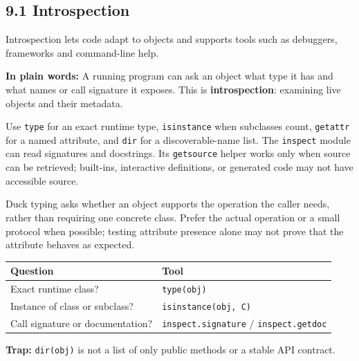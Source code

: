 \documentclass[11pt]{article}
\begin{document}
\begin{keepsection}
\section{9.1 Introspection}

Introspection lets code adapt to objects and supports tools such as debuggers, frameworks and command-line help.

\begin{plainbox}\textbf{In plain words:} A running program can ask an object what type it has and what names or call signature it exposes. This is \textbf{introspection}: examining live objects and their metadata.\end{plainbox}

Use \texttt{type} for an exact runtime type, \texttt{isinstance} when subclasses count, \texttt{getattr} for a named attribute, and \texttt{dir} for a discoverable-name list. The \texttt{inspect} module can read signatures and docstrings. Its \texttt{getsource} helper works only when source can be retrieved; built-ins, interactive definitions, or generated code may not have accessible source.

Duck typing asks whether an object supports the operation the caller needs, rather than requiring one concrete class. Prefer the actual operation or a small protocol when possible; testing attribute presence alone may not prove that the attribute behaves as expected.

\begin{center}\small\begin{tabularx}{\linewidth}{>{\raggedright\arraybackslash}X>{\raggedright\arraybackslash}X}\toprule
\textbf{Question} & \textbf{Tool} \\ \midrule
Exact runtime class? & \texttt{type(obj)} \\
Instance of class or subclass? & \texttt{isinstance(obj, C)} \\
Call signature or documentation? & \texttt{inspect.signature} / \texttt{inspect.getdoc} \\
\bottomrule\end{tabularx}\end{center}

\begin{notebox}\textbf{Trap:} \texttt{dir(obj)} is not a list of only public methods or a stable API contract.\end{notebox}


\end{keepsection}
\end{document}
